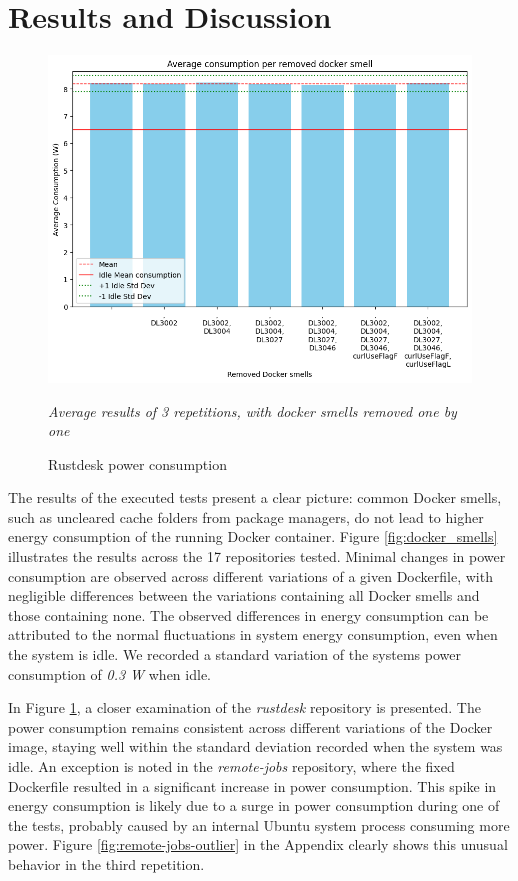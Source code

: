 \documentclass[conference]{IEEEtran}
\begin{document}
\section{Results and Discussion}

\begin{figure}[h]
    \centering
    \includegraphics[width=\linewidth]{graphics/rustdesk_widt_std.png}
    \caption{Rustdesk power consumption}
    \textit{Average results of 3 repetitions, with docker smells removed one by one}
    \label{fig:rustdesk}
\end{figure}

The results of the executed tests present a clear picture: common Docker smells, such as uncleared cache folders from package managers, do not lead to higher energy consumption of the running Docker container. Figure \ref{fig:docker_smells} illustrates the results across the 17 repositories tested. Minimal changes in power consumption are observed across different variations of a given Dockerfile, with negligible differences between the variations containing all Docker smells and those containing none. The observed differences in energy consumption can be attributed to the normal fluctuations in system energy consumption, even when the system is idle. We recorded a standard variation of the systems power consumption of \textit{0.3 W} when idle. 

In Figure \ref{fig:rustdesk}, a closer examination of the \textit{rustdesk} repository is presented. The power consumption remains consistent across different variations of the Docker image, staying well within the standard deviation recorded when the system was idle. An exception is noted in the \textit{remote-jobs} repository, where the fixed Dockerfile resulted in a significant increase in power consumption. This spike in energy consumption is likely due to a surge in power consumption during one of the tests, probably caused by an internal Ubuntu system process consuming more power. Figure \ref{fig:remote-jobs-outlier} in the Appendix clearly shows this unusual behavior in the third repetition.
\end{document}
